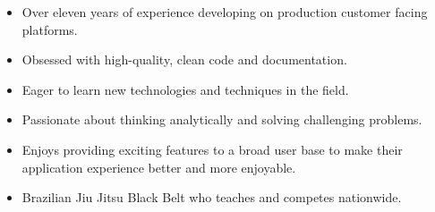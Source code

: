 \documentclass[10pt,a4paper]{resume}
\begin{document}





\begin{fullwidth}
\makecvheader
\end{fullwidth}





\begin{itemize}
\item Over eleven years of experience developing on production customer facing platforms.
\item Obsessed with high-quality, clean code and documentation.
\item Eager to learn new technologies and techniques in the field.
\item Passionate about thinking analytically and solving challenging problems.
\item Enjoys providing exciting features to a broad user base to make their application experience better and more enjoyable.
\item Brazilian Jiu Jitsu Black Belt who teaches and competes nationwide.
\end{itemize}
\end{document}
